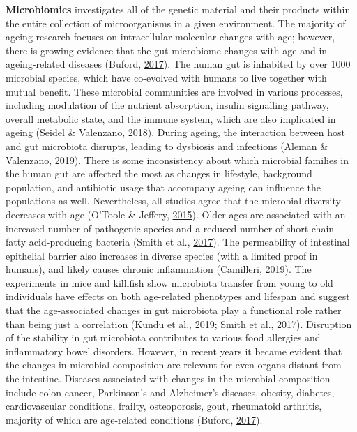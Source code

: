 \documentclass[12pt,twoside]{unicam}
\begin{document}
\textbf{Microbiomics} investigates all of the genetic material and their products within the entire collection of microorganisms in a given environment. The majority of ageing research focuses on intracellular molecular changes with age; however, there is growing evidence that the gut microbiome changes with age and in ageing-related diseases (Buford, \protect\hyperlink{ref-Buford2017}{2017}). The human gut is inhabited by over 1000 microbial species, which have co-evolved with humans to live together with mutual benefit. These microbial communities are involved in various processes, including modulation of the nutrient absorption, insulin signalling pathway, overall metabolic state, and the immune system, which are also implicated in ageing (Seidel \& Valenzano, \protect\hyperlink{ref-Seidel2018}{2018}). During ageing, the interaction between host and gut microbiota disrupts, leading to dysbiosis and infections (Aleman \& Valenzano, \protect\hyperlink{ref-Aleman2019}{2019}). There is some inconsistency about which microbial families in the human gut are affected the most as changes in lifestyle, background population, and antibiotic usage that accompany ageing can influence the populations as well. Nevertheless, all studies agree that the microbial diversity decreases with age (O'Toole \& Jeffery, \protect\hyperlink{ref-OToole2015}{2015}). Older ages are associated with an increased number of pathogenic species and a reduced number of short-chain fatty acid-producing bacteria (Smith et al., \protect\hyperlink{ref-Smith2017}{2017}). The permeability of intestinal epithelial barrier also increases in diverse species (with a limited proof in humans), and likely causes chronic inflammation (Camilleri, \protect\hyperlink{ref-Camilleri2019}{2019}). The experiments in mice and killifish show microbiota transfer from young to old individuals have effects on both age-related phenotypes and lifespan and suggest that the age-associated changes in gut microbiota play a functional role rather than being just a correlation (Kundu et al., \protect\hyperlink{ref-Kundu2019}{2019}; Smith et al., \protect\hyperlink{ref-Smith2017}{2017}). Disruption of the stability in gut microbiota contributes to various food allergies and inflammatory bowel disorders. However, in recent years it became evident that the changes in microbial composition are relevant for even organs distant from the intestine. Diseases associated with changes in the microbial composition include colon cancer, Parkinson's and Alzheimer's diseases, obesity, diabetes, cardiovascular conditions, frailty, osteoporosis, gout, rheumatoid arthritis, majority of which are age-related conditions (Buford, \protect\hyperlink{ref-Buford2017}{2017}).
\end{document}
